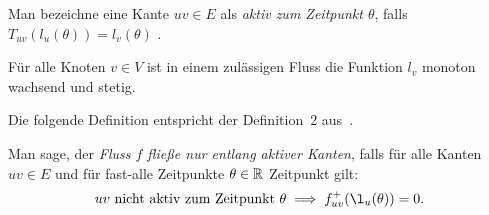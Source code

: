 \begin{definition}
	Man bezeichne eine Kante $uv\in E$ als \emph{aktiv zum Zeitpunkt $\theta$}, falls $T_{uv}(l_u(\theta)) = l_v(\theta)$ .
\end{definition}

\begin{lemma}
	Für alle Knoten $v\in V$ ist in einem zulässigen Fluss die Funktion $l_v$ monoton wachsend und stetig.
\end{lemma}

Die folgende Definition entspricht der Definition~2 aus~\cite{Koch2011}.

\begin{definition}
	Man sage, der \emph{Fluss $f$ fließe nur entlang aktiver Kanten}, falls für alle Kanten $uv\in E$ und für fast-alle Zeitpunkte $\theta\in\mathbb{R}$ Zeitpunkt gilt: $$ uv \text{ nicht aktiv zum Zeitpunkt } \theta \implies f_{uv}^+(\l_u(\theta)) = 0.$$
\end{definition}

